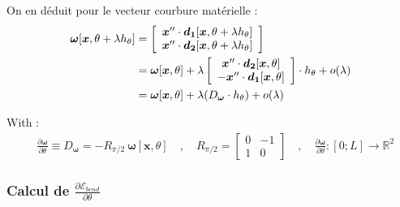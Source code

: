 On en déduit pour le vecteur courbure matérielle :
\begin{align}
	\boldsymbol{\omega}[\boldsymbol{x}, \theta + \lambda h_{\theta}] & = 
	\left[\begin{array}{c}
	\boldsymbol{x}'' \cdot  \boldsymbol{d_1}[\boldsymbol{x}, \theta + \lambda h_{\theta}]\\
	\boldsymbol{x}'' \cdot \boldsymbol{d_2}[\boldsymbol{x}, \theta + \lambda h_{\theta}]\\
	\end{array}\right] \\
	& = \boldsymbol{\omega}[\boldsymbol{x}, \theta] + \lambda 
	\left[\begin{array}{c}
	\boldsymbol{x}'' \cdot  \boldsymbol{d_2}[\boldsymbol{x}, \theta]\\
	- \boldsymbol{x}'' \cdot \boldsymbol{d_1}[\boldsymbol{x}, \theta]\\
	\end{array}\right] \cdot h_{\theta}
	 + o(\lambda)\notag\\
	 & = \boldsymbol{\omega}[\boldsymbol{x}, \theta] + \lambda(D_{\boldsymbol{\omega}} \cdot h_{\theta}) + o(\lambda)\notag
\end{align}

With :
\begin{align}
	&\frac{\partial \boldsymbol{\omega}}{\partial \theta} \equiv D_{\boldsymbol{\omega}} = - R_{\pi/2}\:\boldsymbol{\omega}[\boldsymbol{x}, \theta]
	\quad , \quad R_{\pi/2} = \left[\begin{array}{cc}0 & -1 \\1 & 0\end{array}\right]
	\quad , \quad \frac{\partial \boldsymbol{\omega}}{\partial \theta}  : [0;L] \longrightarrow \mathbb{R}^2
\end{align}


\subsubsection{Calcul de $\frac{\partial \mathcal{E}_{bend}}{\partial \theta}$}

